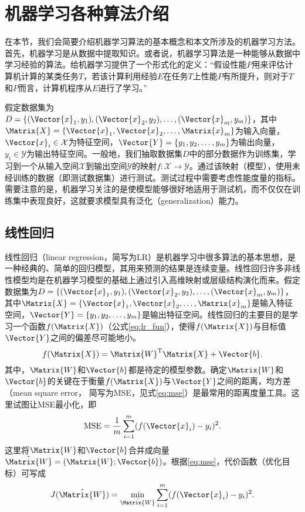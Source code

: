 \section{机器学习各种算法介绍}\label{sec:机器学习各种算法介绍}

在本节，我们会简要介绍机器学习算法的基本概念和本文所涉及的机器学习方法。首先，机器学习是从数据中提取知识。或者说，机器学习算法是一种能够从数据中学习经验的算法。\citet{Mitchell1997Machine}给机器学习提供了一个形式化的定义：``假设性能$P$用来评估计算机计算的某类任务$T$，若该计算利用经验$E$在任务$T$上性能$P$有所提升，则对于$T$和$P$而言，计算机程序从$E$进行了学习。''

假定数据集为$D=\{(\Vector{x}_1,y_1),(\Vector{x}_2,y_2),\ldots,(\Vector{x}_m,y_m)\}$，其中$\Matrix{X}=\{\Vector{x}_1,\Vector{x}_2,\ldots,\Matrix{x}_m\}$为输入向量，$\Vector{x}_i\in\mathcal{X}$为特征空间，$\Vector{Y}=\{y_1,y_2,\ldots,y_m\}$为输出向量，$y_i\in\mathcal{Y}$为输出特征空间。一般地，我们抽取数据集$D$中的部分数据作为训练集，学习到一个从输入空间$\mathcal{X}$到输出空间$\mathcal{Y}$的映射$f:\mathcal{X}\rightarrow\mathcal{Y}$。通过该映射（模型），使用未经训练的数据（即测试数据集）进行测试。测试过程中需要考虑性能度量的指标。需要注意的是，机器学习关注的是使模型能够很好地适用于测试机，而不仅仅在训练集中表现良好，这就要求模型具有泛化（generalization）能力。


\subsection{线性回归}\label{sec:线性回归}

线性回归（linear regression，简写为LR）是机器学习中很多算法的基本思想，是一种经典的、简单的回归模型，其用来预测的结果是连续变量。线性回归许多非线性模型均是在机器学习模型的基础上通过引入高维映射或层级结构演化而来。假定数据集为$D=\{(\Vector{x}_1,y_1),(\Vector{x}_2,y_2),\ldots,(\Vector{x}_m,y_m)\}$，其中$\Matrix{X}=\{\Vector{x}_1,\Vector{x}_2,\ldots,\Matrix{x}_m\}$是输入特征空间，$\Vector{Y}=\{y_1,y_2,\ldots,y_m\}$是输出特征空间。线性回归的主要目的是学习一个函数$f(\Matrix{X})$（公式\ref{eq:lr_fun}），使得$f(\Matrix{X})$与目标值$\Vector{Y}$之间的偏差尽可能地小。
\begin{equation}
  \label{eq:lr_fun}
  f(\Matrix{X})=\Matrix{W}^{\text{T}}\Matrix{X}+\Vector{b}.
\end{equation}
其中，$\Matrix{W}$和$\Vector{b}$都是待定的模型参数。确定$\Matrix{W}$和$\Vector{b}$的关键在于衡量$f(\Matrix{X})$与$\Vector{Y}$之间的距离，均方差（mean square error， 简写为MSE，见式\ref{eq:mse}）是最常用的距离度量工具。这里试图让MSE最小化，即
\begin{equation}
  \label{eq:mse}
  \text{MSE}=\frac{1}{m}\sum_{i=1}^{m}(f(\Vector{x}_i)-y_i)^2.
\end{equation}
这里将$\Matrix{W}$和$\Vector{b}$合并成向量$\hat{\Matrix{W}}=(\Matrix{W};\Vector{b})$。根据\ref{eq:mse}，代价函数（优化目标）可写成
\begin{equation}
  \label{eq:lr_loss}
  J(\hat{\Matrix{W}})=\min_{\hat{\Matrix{W}}}\sum_{i=1}^{m}(f(\Vector{x}_i)-y_i)^2.
\end{equation}

